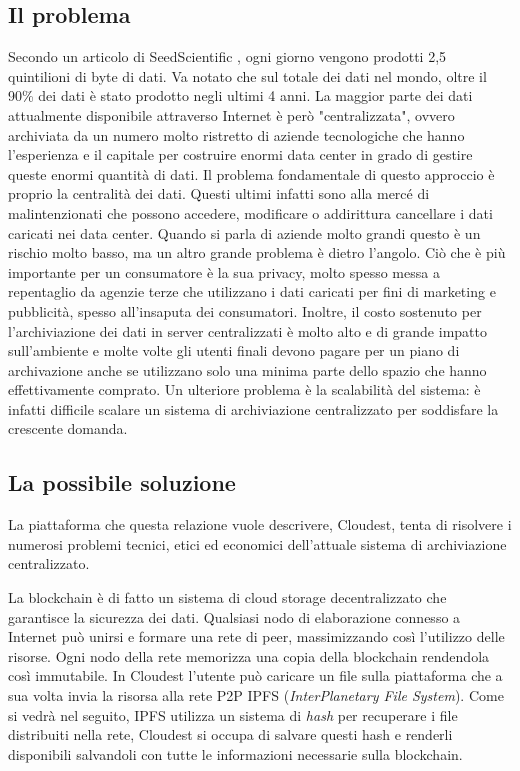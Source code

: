 \documentclass{article}
\begin{document}
\subsection{Il problema}
Secondo un articolo di SeedScientific \cite{seed_scientific_article}, ogni giorno vengono prodotti 2,5 quintilioni di byte di dati. Va notato che sul totale dei dati nel mondo, oltre il 90\% dei dati è stato prodotto negli ultimi 4 anni. La maggior parte dei dati attualmente disponibile attraverso Internet è però "centralizzata", ovvero archiviata da un numero molto ristretto di aziende tecnologiche che hanno l'esperienza e il capitale per costruire enormi data center in grado di gestire queste enormi quantità di dati. Il problema fondamentale di questo approccio è proprio la centralità dei dati. Questi ultimi infatti sono alla mercé di malintenzionati che possono accedere, modificare o addirittura cancellare i dati caricati nei data center. Quando si parla di aziende molto grandi questo è un rischio molto basso, ma un altro grande problema è dietro l'angolo. Ciò che è più importante per un consumatore è la sua privacy, molto spesso messa a repentaglio da agenzie terze che utilizzano i dati caricati per fini di marketing e pubblicità, spesso all'insaputa dei consumatori. Inoltre, il costo sostenuto per l'archiviazione dei dati in server centralizzati è molto alto e di grande impatto sull'ambiente e molte volte gli utenti finali devono pagare per un piano di archivazione anche se utilizzano solo una minima parte dello spazio che hanno effettivamente comprato. Un ulteriore problema è la scalabilità del sistema: è infatti difficile scalare un sistema di archiviazione centralizzato per soddisfare la crescente domanda.

\subsection{La possibile soluzione}
La piattaforma che questa relazione vuole descrivere, Cloudest, tenta di risolvere i numerosi problemi tecnici, etici ed economici dell'attuale sistema di archiviazione centralizzato. 

La blockchain è di fatto un sistema di cloud storage decentralizzato che garantisce la sicurezza dei dati. Qualsiasi nodo di elaborazione connesso a Internet può unirsi e formare una rete di peer, massimizzando così l'utilizzo delle risorse. Ogni nodo della rete memorizza una copia della blockchain rendendola così immutabile. In Cloudest l'utente può caricare un file sulla piattaforma che a sua volta invia la risorsa alla rete P2P IPFS (\textit{InterPlanetary File System}). Come si vedrà nel seguito, IPFS utilizza un sistema di \textit{hash} per recuperare i file distribuiti nella rete, Cloudest si occupa di salvare questi hash e renderli disponibili salvandoli con tutte le informazioni necessarie sulla blockchain.
\end{document}
